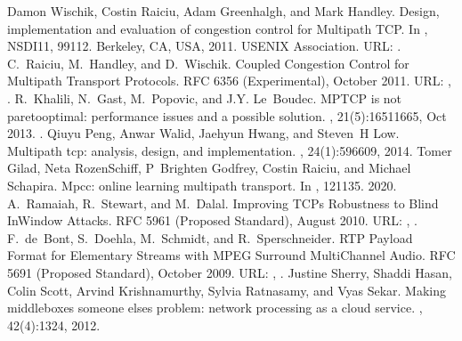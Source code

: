 \documentclass[letterpaper,10pt,english]{sphinxmanual}
\begin{document}
\begin{sphinxthebibliography}{10}
\sphinxAtStartPar
Damon Wischik, Costin Raiciu, Adam Greenhalgh, and Mark Handley. Design, implementation and evaluation of congestion control for Multipath TCP. In , NSDI\textquotesingle{}11, 99\textendash{}112. Berkeley, CA, USA, 2011. USENIX Association. URL: .
\sphinxAtStartPar
C. Raiciu, M. Handley, and D. Wischik. Coupled Congestion Control for Multipath Transport Protocols. RFC 6356 (Experimental), October 2011. URL: , .
\sphinxAtStartPar
R. Khalili, N. Gast, M. Popovic, and J.\sphinxhyphen{}Y. Le Boudec. MPTCP is not pareto\sphinxhyphen{}optimal: performance issues and a possible solution. , 21(5):1651\textendash{}1665, Oct 2013. .
\sphinxAtStartPar
Qiuyu Peng, Anwar Walid, Jaehyun Hwang, and Steven H Low. Multipath tcp: analysis, design, and implementation. , 24(1):596\textendash{}609, 2014.
\sphinxAtStartPar
Tomer Gilad, Neta Rozen\sphinxhyphen{}Schiff, P Brighten Godfrey, Costin Raiciu, and Michael Schapira. Mpcc: online learning multipath transport. In , 121\textendash{}135. 2020.
\sphinxAtStartPar
A. Ramaiah, R. Stewart, and M. Dalal. Improving TCP\textquotesingle{}s Robustness to Blind In\sphinxhyphen{}Window Attacks. RFC 5961 (Proposed Standard), August 2010. URL: , .
\sphinxAtStartPar
F. de Bont, S. Doehla, M. Schmidt, and R. Sperschneider. RTP Payload Format for Elementary Streams with MPEG Surround Multi\sphinxhyphen{}Channel Audio. RFC 5691 (Proposed Standard), October 2009. URL: , .
\sphinxAtStartPar
Justine Sherry, Shaddi Hasan, Colin Scott, Arvind Krishnamurthy, Sylvia Ratnasamy, and Vyas Sekar. Making middleboxes someone else\textquotesingle{}s problem: network processing as a cloud service. , 42(4):13\textendash{}24, 2012.

\end{sphinxthebibliography}
\end{document}
